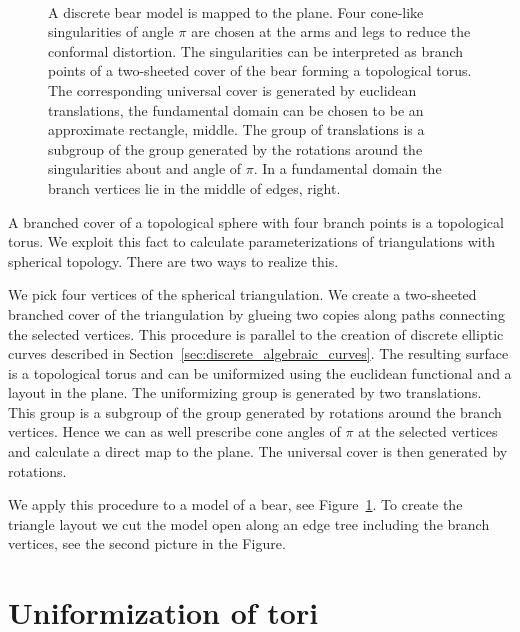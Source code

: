 \documentclass[Thesis]{subfiles}
\begin{document}
\begin{figure}
\centering
{}\\
\caption{
A discrete bear model is mapped to the plane.
Four cone-like singularities of angle $\pi$ are chosen at the arms and legs to reduce the conformal distortion.
The singularities can be interpreted as branch points of a two-sheeted cover of the bear forming a topological torus.
The corresponding universal cover is generated by euclidean translations, the fundamental domain can be chosen to be an approximate rectangle, middle.
The group of translations is a subgroup of the group generated by the rotations around the singularities about and angle of $\pi$. In a fundamental domain the branch vertices lie in the middle of edges, right.
}
\label{fig:bear}
\end{figure}

A branched cover of a topological sphere with four branch points is a topological torus.
We exploit this fact to calculate parameterizations of triangulations with spherical topology.
There are two ways to realize this.

We pick four vertices of the spherical triangulation. We create a two-sheeted branched cover of the triangulation by glueing two copies along paths connecting the selected vertices.
This procedure is parallel to the creation of discrete elliptic curves described in Section~\ref{sec:discrete_algebraic_curves}.
The resulting surface is a topological torus and can be uniformized using the euclidean functional and a layout in the plane.
The uniformizing group is generated by two translations.
This group is a subgroup of the group generated by rotations around the branch vertices.
Hence we can as well prescribe cone angles of $\pi$ at the selected vertices and calculate a direct map to the plane.
The universal cover is then generated by rotations.

We apply this procedure to a model of a bear, see Figure~\ref{fig:bear}. To create the triangle layout we cut the model open along an edge tree including the branch vertices, see the second picture in the Figure.

\section{Uniformization of tori}
\label{sec:tori}
\end{document}

